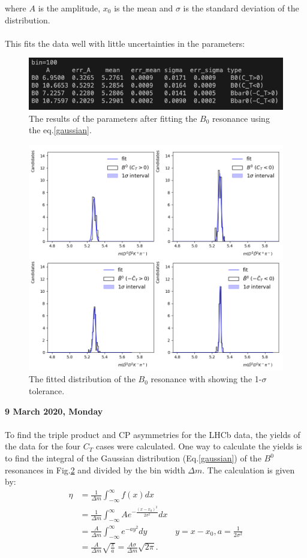 where $A$ is the amplitude, $x_0$ is the mean and $\sigma$ is the standard deviation of the distribution.
\\
\\
This fits the data well with little uncertainties in the parameters:
\begin{figure}[h]
\center
\includegraphics*[width=0.76\linewidth]{LHCb_runI/B0_fit}
\caption{The results of the parameters after fitting the $B_0$ resonance using the eq.\ref{gaussian}.}
\label{fit_B0_runi}
\end{figure}
\begin{figure}[h]
\center
\includegraphics*[width=0.76\linewidth]{LHCb_runI/invmass_B0_fit_tp}
\caption{The fitted distribution of the $B_0$ resonance with showing the 1-$\sigma$ tolerance.}
\label{fit_B0_plot_runi}
\end{figure}
\clearpage
\noindent\textbf{9 March 2020, Monday}
\\
\\
To find the triple product and CP asymmetries for the LHCb data, the yields of the data for the four $C_T$ cases were calculated. One way to calculate the yields is to find the integral of the Gaussian distribution (Eq.\ref{gaussian}) of the $B^0$ resonances in Fig.\ref{fit_B0_plot_runi} and divided by the bin width $\Delta m$. The calculation is given by:
\begin{align}
    \eta &= \frac{1}{\Delta m}\int^{\infty}_{-\infty} f(x) dx \nonumber\\
         &= \frac{1}{\Delta m}\int^{\infty}_{-\infty} Ae^{-\frac{(x-x_0)^2}{2\sigma^2}} dx \nonumber\\
         &= \frac{A}{\Delta m}\int^{\infty}_{-\infty} e^{-ay^2} dy \;\;\;\;\;\;\;\;\;\;\;\; y = x-x_0, a = \frac{1}{2\sigma^2} \nonumber\\
         &= \frac{A}{\Delta m}\sqrt{\frac{\pi}{a}} 
         = \frac{A\sigma}{\Delta m}\sqrt{2\pi}.
\end{align}
